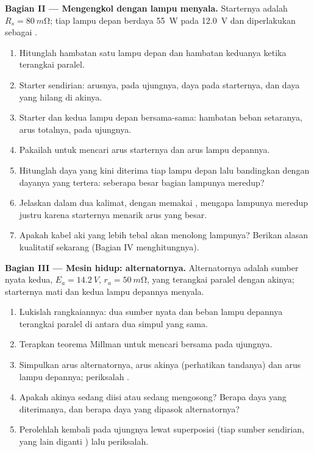 \begin{problem}
\medskip
\noindent\textbf{Bagian II --- Mengengkol dengan lampu menyala.}
Starternya adalah  $R_s = \qty{80}{m\ohm}$; tiap lampu depan
berdaya \qty{55}{W} pada \qty{12.0}{V} dan diperlakukan sebagai .
\begin{enumerate}[resume]
  \item Hitunglah hambatan satu lampu depan dan hambatan keduanya ketika
        terangkai paralel.
  \item Starter sendirian: arusnya,  pada ujungnya, daya pada
        starternya, dan daya yang hilang di akinya.
  \item Starter dan kedua lampu depan bersama-sama: hambatan beban
        setaranya, arus totalnya,  pada ujungnya.
  \item Pakailah  untuk mencari arus starternya dan arus
        lampu depannya.
  \item Hitunglah daya yang kini diterima tiap lampu depan lalu
        bandingkan dengan dayanya yang tertera: seberapa besar bagian
        lampunya meredup?
  \item Jelaskan dalam dua kalimat, dengan memakai , mengapa
        lampunya meredup justru karena starternya menarik arus yang besar.
  \item Apakah kabel aki yang lebih tebal akan menolong lampunya?
        Berikan alasan kualitatif sekarang (Bagian IV menghitungnya).
\end{enumerate}

\medskip
\noindent\textbf{Bagian III --- Mesin hidup: alternatornya.}
Alternatornya adalah sumber nyata kedua, $E_a = \qty{14.2}{V}$,
$r_a = \qty{50}{m\ohm}$, yang terangkai paralel dengan akinya; starternya
mati dan kedua lampu depannya menyala.
\begin{enumerate}[resume]
  \item Lukislah rangkaiannya: dua sumber nyata dan beban lampu depannya
        terangkai paralel di antara dua simpul yang sama.
  \item Terapkan teorema Millman untuk mencari  bersama pada ujungnya.
  \item Simpulkan arus alternatornya, arus akinya (perhatikan tandanya)
        dan arus lampu depannya; periksalah .
  \item Apakah akinya sedang diisi atau sedang mengosong? Berapa daya
        yang diterimanya, dan berapa daya yang dipasok alternatornya?
  \item Perolehlah kembali  pada ujungnya lewat superposisi
        (tiap sumber sendirian, yang lain diganti )
        lalu periksalah.
\end{enumerate}


\end{problem}
